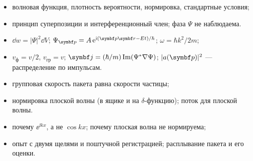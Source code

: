 \begin{examcheck}
\begin{itemize}
 \item волновая функция, плотность вероятности, нормировка, стандартные условия;
 \item принцип суперпозиции и интерференционный член; фаза $\Psi$ не наблюдаема.
\end{itemize}
\begin{itemize}
 \item $\dd w=|\Psi|^2\dd V$; $\Psi_{\vect p}=A\,\ee^{\ii(\vect p\vect r-Et)/\hbar}$; $\omega=\hbar k^2/2m$;
 \item $v_{\text{ф}}=v/2$, $v_{\text{гр}}=v$; $\vect j=(\hbar/m)\operatorname{Im}(\Psi^*\nabla\Psi)$; $|a(\vect p)|^2$ — распределение по импульсам.
\end{itemize}
\begin{itemize}
 \item групповая скорость пакета равна скорости частицы;
 \item нормировка плоской волны (в ящике и на $\delta$-функцию); поток для плоской волны.
\end{itemize}
\begin{itemize}
 \item почему $\ee^{\ii kx}$, а не $\cos kx$; почему плоская волна не нормируема;
 \item опыт с двумя щелями и поштучной регистрацией; расплывание пакета и его оценки.
\end{itemize}
\end{examcheck}
